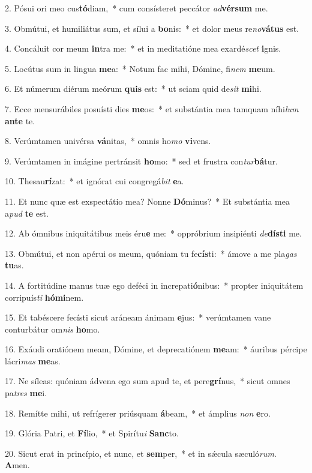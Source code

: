2. Pósui ori meo cus\textbf{tó}diam,~*  cum consísteret peccátor \textit{ad}\textbf{vér}\textbf{sum} me.\

3. Obmútui, et humiliátus sum, et sílui a \textbf{bo}nis:~*  et dolor meus re\textit{no}\textbf{vá}\textbf{tus} est.\

4. Concáluit cor meum \textbf{in}tra me:~*  et in meditatióne mea exardé\textit{scet} \textbf{i}gnis.\

5. Locútus sum in lingua \textbf{me}a:~*  Notum fac mihi, Dómine, fi\textit{nem} \textbf{me}um.\

6. Et númerum diérum meórum \textbf{quis} est:~*  ut sciam quid de\textit{sit} \textbf{mi}hi.\

7. Ecce mensurábiles posuísti dies \textbf{me}os:~*  et substántia mea tamquam níhi\textit{lum} \textbf{an}\textbf{te} te.\

8. Verúmtamen univérsa \textbf{vá}nitas,~*  omnis ho\textit{mo} \textbf{vi}vens.\

9. Verúmtamen in imágine pertránsit \textbf{ho}mo:~*  sed et frustra con\textit{tur}\textbf{bá}tur.\

10. Thesau\textbf{rí}zat:~*  et ignórat cui congregá\textit{bit} \textbf{e}a.\

11. Et nunc quæ est exspectátio mea? Nonne \textbf{Dó}minus?~*  Et substántia mea a\textit{pud} \textbf{te} est.\

12. Ab ómnibus iniquitátibus meis éru\textbf{e} me:~*  oppróbrium insipiénti \textit{de}\textbf{dís}\textbf{ti} me.\

13. Obmútui, et non apérui os meum, quóniam tu fe\textbf{cís}ti:~*  ámove a me pla\textit{gas} \textbf{tu}as.\

14. A fortitúdine manus tuæ ego deféci in increpati\textbf{ó}nibus:~*  propter iniquitátem corripuís\textit{ti} \textbf{hó}\textbf{mi}nem.\

15. Et tabéscere fecísti sicut aráneam ánimam \textbf{e}jus:~*  verúmtamen vane conturbátur om\textit{nis} \textbf{ho}mo.\

16. Exáudi oratiónem meam, Dómine, et deprecatiónem \textbf{me}am:~*  áuribus pércipe lácri\textit{mas} \textbf{me}as.\

17. Ne síleas: quóniam ádvena ego sum apud te, et pere\textbf{grí}nus,~*  sicut omnes pa\textit{tres} \textbf{me}i.\

18. Remítte mihi, ut refrígerer priúsquam \textbf{á}beam,~*  et ámplius \textit{non} \textbf{e}ro.\

19. Glória Patri, et \textbf{Fí}lio,~*  et Spirítu\textit{i} \textbf{Sanc}to.\

20. Sicut erat in princípio, et nunc, et \textbf{sem}per,~*  et in sǽcula sæculó\textit{rum}. \textbf{A}men.\

